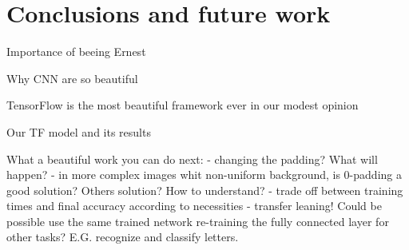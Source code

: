 \chapter{Conclusions and future work}\label{ch:conclusions}

Importance of beeing Ernest

Why CNN are so beautiful

TensorFlow is the most beautiful framework ever in our modest opinion

Our TF model and its results

What a beautiful work you can do next:
- changing the padding? What will happen?
- in more complex images whit non-uniform background, is 0-padding a good solution? Others solution? How to understand?
- trade off between training times and final accuracy according to necessities
- transfer leaning! Could be possible use the same trained network re-training the fully connected layer for other tasks? E.G. recognize and classify letters.